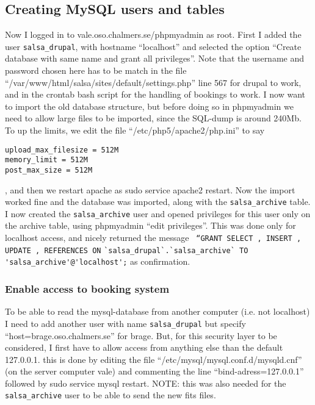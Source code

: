 \subsection{Creating MySQL users and tables}
Now I logged in to vale.oso.chalmers.se/phpmyadmin as root. First I added the
user \verb!salsa_drupal!, with hostname “localhost” and selected the option “Create
database with same name and grant all privileges”. Note that the username and
password chosen here has to be match in the file
“/var/www/html/salsa/sites/default/settings.php” line 567 for drupal to work,
and in the crontab bash script for the handling of bookings to work. I now want
to import the old database structure, but before doing so in phpmyadmin we need
to allow large files to be imported, since the SQL-dump is around 240Mb. To up
the limits, we edit the file “/etc/php5/apache2/php.ini” to say
\begin{verbatim}
upload_max_filesize = 512M
memory_limit = 512M
post_max_size = 512M
\end{verbatim}
, and then we restart apache as sudo service apache2 restart. Now the import
worked fine and the database was imported, along with the \verb!salsa_archive!
table. I now created the \verb!salsa_archive! user and opened privileges for this user
only on the archive table, using phpmyadmin “edit privileges”. This was
done only for localhost access, and nicely returned the message 
\verb! “GRANT SELECT , INSERT , UPDATE , REFERENCES ON! \newline
\verb!`salsa_drupal`.`salsa_archive` TO 'salsa_archive'@'localhost';! 
as confirmation.  
\subsubsection{Enable access to booking system}
To be able to read the mysql-database from
another computer (i.e. not localhost) I need to add another user with name
\verb!salsa_drupal! but specify “host=brage.oso.chalmers.se” for brage. But, for
this security layer to be considered, I first have to allow access from
anything else than the default 127.0.0.1. this is done by editing the file
“/etc/mysql/mysql.conf.d/mysqld.cnf” (on the server computer vale) and
commenting the line “bind-adress=127.0.0.1” followed by sudo service mysql
restart. NOTE: this was also needed for the \verb!salsa_archive! user to be
able to send the new fits files.

